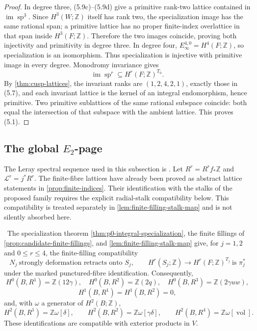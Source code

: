 \begin{proof}
In degree three, (5.9c)--(5.9d) give a primitive rank-two lattice contained
in \(\operatorname{im}\operatorname{sp}^3\).  Since
\(H^3(W;\mathbb Z)\) itself has rank two, the specialization image has the
same rational span; a primitive lattice has no proper finite-index
overlattice in that span inside \(H^3(F;\mathbb Z)\).  Therefore the two
images coincide, proving both injectivity and primitivity in degree three.
In degree four, \(E_\infty^{4,0}=H^4(F;\mathbb Z)\), so specialization is an
isomorphism.  Thus specialization is injective with primitive image in every
degree.  Monodromy invariance gives
\[
 \operatorname{im}\operatorname{sp}^r
 \subseteq H^r(F;\mathbb Z)^{T_0}.
\]
By \cref{thm:cusp-lattices}, the invariant ranks are
\((1,2,4,2,1)\), exactly those in (5.7), and each invariant lattice is the
kernel of an integral endomorphism, hence primitive.  Two primitive
sublattices of the same rational subspace coincide: both equal the
intersection of that subspace with the ambient lattice.  This proves (5.1).
\end{proof}

\subsection{The global \texorpdfstring{\(E_2\)}{E2}-page}

The Leray spectral sequence used in this subsection is
\cite[Corollary~2.3.4]{Dimca2004}.
Let \(R^r=R^rf_*\mathbb Z\) and
\(\mathcal L^r=j^*R^r\).  The finite-fibre lattices have already been proved
as abstract lattice statements in \cref{prop:finite-indices}.  Their
identification with the stalks of the proposed family requires the explicit
radial-stalk compatibility below.  This compatibility is treated separately
in \cref{lem:finite-filling-stalk-map} and is not silently absorbed here.

\begin{proposition}
\label{prop:leray-e2}
\Verified\ The specialization theorem
\cref{thm:p0-integral-specialization}, the finite fillings of
\cref{prop:candidate-finite-fillings}, and
\cref{lem:finite-filling-stalk-map} give, for \(j=1,2\) and
\(0\le r\le4\), the finite-filling compatibility
\[
\tag{FF}
 N_j\ \text{strongly deformation retracts onto }S_j,\qquad
 H^r(S_j;\mathbb Z)\longrightarrow H^r(F;\mathbb Z)^{T_j}
 \ \text{is }\pi_j^*
\]
under the marked punctured-fibre identification.  Consequently,
\[
H^0(B,R^1)=\mathbb Z(12\gamma),\quad
H^0(B,R^2)=\mathbb Z(2q),\quad
H^0(B,R^3)=\mathbb Z(2\gamma uw),
\tag{5.10}
\]
\[
 H^1(B,R^1)=H^1(B,R^2)=0,
\tag{5.11}
\]
and, with \(\omega\) a generator of \(H^2(B;\mathbb Z)\),
\[
H^2(B,R^1)=\mathbb Z\omega[\delta],\qquad
H^2(B,R^2)=\mathbb Z\omega[\gamma\delta],\qquad
H^2(B,R^4)=\mathbb Z\omega[\operatorname{vol}].
\tag{5.12}
\]
These identifications are compatible with exterior products in \(V\).
\end{proposition}

